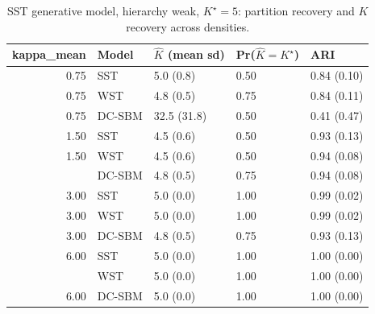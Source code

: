 \begin{table}
\centering
\caption{SST generative model, hierarchy weak, $K^\star=5$: partition recovery and $K$ recovery across densities.}
\centering
\begin{tabular}[t]{rllll}
\toprule
kappa_mean & Model & $\hat K$ (mean sd) & Pr($\hat K = K^\star$) & ARI\\
\midrule
0.75 & SST & 5.0 (0.8) & 0.50 & 0.84 (0.10)\\
0.75 & WST & 4.8 (0.5) & 0.75 & 0.84 (0.11)\\
0.75 & DC-SBM & 32.5 (31.8) & 0.50 & 0.41 (0.47)\\
1.50 & SST & 4.5 (0.6) & 0.50 & 0.93 (0.13)\\
1.50 & WST & 4.5 (0.6) & 0.50 & 0.94 (0.08)\\
\addlinespace
1.50 & DC-SBM & 4.8 (0.5) & 0.75 & 0.94 (0.08)\\
3.00 & SST & 5.0 (0.0) & 1.00 & 0.99 (0.02)\\
3.00 & WST & 5.0 (0.0) & 1.00 & 0.99 (0.02)\\
3.00 & DC-SBM & 4.8 (0.5) & 0.75 & 0.93 (0.13)\\
6.00 & SST & 5.0 (0.0) & 1.00 & 1.00 (0.00)\\
\addlinespace
6.00 & WST & 5.0 (0.0) & 1.00 & 1.00 (0.00)\\
6.00 & DC-SBM & 5.0 (0.0) & 1.00 & 1.00 (0.00)\\
\bottomrule
\end{tabular}
\end{table}
